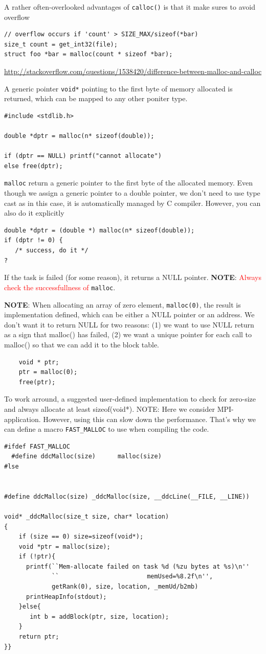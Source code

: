 A rather often-overlooked advantages of \verb!calloc()! is that it make sures
to avoid overflow
\begin{verbatim}
// overflow occurs if 'count' > SIZE_MAX/sizeof(*bar)
size_t count = get_int32(file);
struct foo *bar = malloc(count * sizeof *bar);
\end{verbatim}
\url{http://stackoverflow.com/questions/1538420/difference-between-malloc-and-calloc}


A generic pointer \verb!void*! pointing to the first byte of memory allocated is
returned, which can be mapped to any other poniter type.
\begin{lstlisting}
#include <stdlib.h>

double *dptr = malloc(n* sizeof(double));

if (dptr == NULL) printf("cannot allocate")
else free(dptr);
\end{lstlisting}

\verb!malloc! return a generic pointer to the first byte of the
allocated memory. Even though we assign a generic pointer to a double
pointer, we don't need to use type cast as in this case, it is
automatically managed by C compiler. However, you can also do it explicitly 

\begin{lstlisting}
double *dptr = (double *) malloc(n* sizeof(double));
if (dptr != 0) {
   /* success, do it */
?
\end{lstlisting}
If the task is failed (for some reason), it returns a NULL pointer. {\bf NOTE}:
\textcolor{red}{Always check the successfullness of }\verb!malloc!.

{\bf NOTE}: When allocating an array of zero element, \verb!malloc(0)!, the
result is implementation defined, which can be either a NULL pointer or an
address. We don't want it to return NULL for two reasons: (1) we want to use
NULL return as a sign that malloc() has failed, (2) we want a unique pointer for each
call to malloc() so that we can add it to the block table.
\begin{verbatim}
    void * ptr;
    ptr = malloc(0);
    free(ptr);
\end{verbatim}
To work arround, a suggested user-defined implementation to check for zero-size
and always allocate at least sizeof(void*). NOTE: Here we consider
MPI-application. However, using this can slow down the performance. That's why
we can define a macro \verb!FAST_MALLOC! to use when compiling the code.

{\small \begin{verbatim}
#ifdef FAST_MALLOC
  #define ddcMalloc(size)      malloc(size)
#lse


#define ddcMalloc(size) _ddcMalloc(size, __ddcLine(__FILE, __LINE))

void* _ddcMalloc(size_t size, char* location)
{
	if (size == 0) size=sizeof(void*);
	void *ptr = malloc(size);
	if (!ptr){
	  printf(``Mem-allocate failed on task %d (%zu bytes at %s)\n''
	         ``                        memUsed=%8.2f\n'', 
	         getRank(0), size, location, _memUd/b2mb)
	  printHeapInfo(stdout);
	}else{
	   int b = addBlock(ptr, size, location);
	}
	return ptr;
}}
\end{verbatim}}



